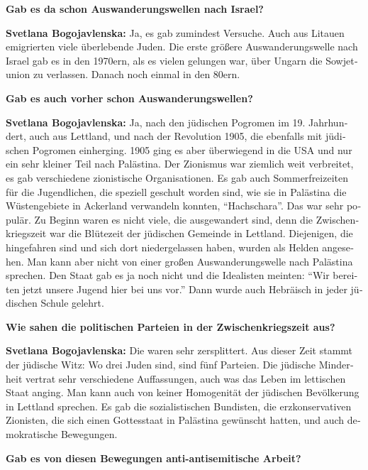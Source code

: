 \begin{otherlanguage}{ngerman}
\textbf{Gab es da schon Auswanderungswellen nach Israel?}

\textbf{Svetlana Bogojavlenska:} Ja, es gab zumindest Versuche. Auch aus Litauen emigrierten viele überlebende Juden. Die erste größere Auswanderungswelle nach Israel gab es in den 1970ern, als es vielen gelungen war, über Ungarn die Sowjetunion zu verlassen. Danach noch einmal in den 80ern. 

\textbf{Gab es auch vorher schon Auswanderungswellen?}

\textbf{Svetlana Bogojavlenska:} Ja, nach den jüdischen Pogromen im 19. Jahrhundert, auch aus Lettland, und nach der Revolution 1905, die ebenfalls mit jüdischen Pogromen einherging. 1905 ging es aber überwiegend in die USA und nur ein sehr kleiner Teil nach Palästina. Der Zionismus war ziemlich weit verbreitet, es gab verschiedene zionistische Organisationen. Es gab auch Sommerfreizeiten für die Jugendlichen, die speziell geschult worden sind, wie sie in Palästina die Wüstengebiete in Ackerland verwandeln konnten, "`Hachschara"'. Das war sehr populär. Zu Beginn waren es nicht viele, die ausgewandert sind, denn die Zwischenkriegszeit war die Blütezeit der jüdischen Gemeinde in Lettland. Diejenigen, die hingefahren sind und sich dort niedergelassen haben, wurden als Helden angesehen. Man kann aber nicht von einer großen Auswanderungswelle nach Palästina sprechen. Den Staat gab es ja noch nicht und die Idealisten meinten: "`Wir bereiten jetzt unsere Jugend hier bei uns vor."' Dann wurde auch Hebräisch in jeder jüdischen Schule gelehrt.

\textbf{Wie sahen die politischen Parteien in der Zwischenkriegszeit aus?}

\textbf{Svetlana Bogojavlenska:} Die waren sehr zersplittert. Aus dieser Zeit stammt der jüdische Witz: Wo drei Juden sind, sind fünf Parteien. Die jüdische Minderheit vertrat sehr verschiedene Auffassungen, auch was das Leben im lettischen Staat anging. Man kann auch von keiner Homogenität der jüdischen Bevölkerung in Lettland sprechen. Es gab die sozialistischen Bundisten, die erzkonservativen Zionisten, die sich einen Gottesstaat in Palästina gewünscht hatten, und auch demokratische Bewegungen.

\textbf{Gab es von diesen Bewegungen anti-antisemitische Arbeit?}


\end{otherlanguage}
